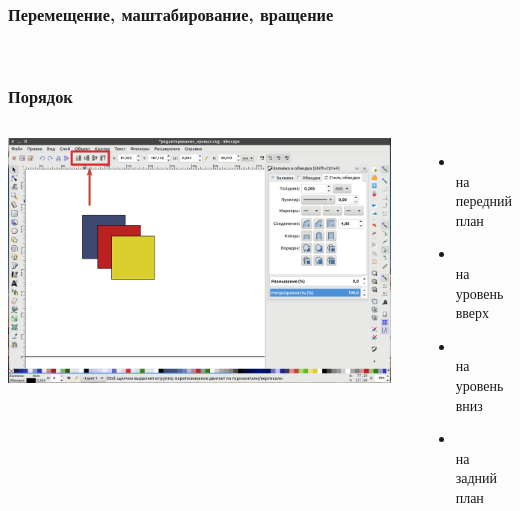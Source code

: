\documentclass[12pt, compress]{beamer}
\begin{document}
\begin{frame}
\frametitle{Перемещение, маштабирование, вращение}
\begin{center}
 \\
\end{center}
\end{frame}

\begin{frame}
\frametitle{Порядок}
\begin{columns}
\centering
\includegraphics[trim={0 0 15cm 0},clip, width=0.95\textwidth]{порядок.png}
\begin{itemize}
  \item {} \\ на передний план
  \item {} \\ на уровень вверх
  \item {} \\ на уровень вниз
  \item {} \\ на задний план
\end{itemize}

\end{columns}
\end{frame}
\end{document}
